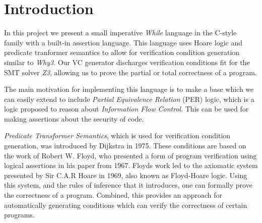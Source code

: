 \section{Introduction}



In this project we present a small imperative \textit{While} language in the C-style family with a built-in assertion language.
This language uses Hoare logic and predicate tranformer semantics to allow for verification condition generation similar to \textit{Why3}.
Our VC generator discharges verification conditions fit for the SMT solver \textit{Z3}, allowing us to prove the partial or total correctness of a program.

The main motivation for implementing this language is to make a base which we can easily extend to include \textit{Partial Equivalence Relation} (PER) logic, which is a logic proposed to reason about \textit{Information Flow Control}\cite{Filinski-Jensen-Larsen:Unpublished-IFC}. This can be used for making assertions about the security of code.

\textit{Predicate Transformer Semantics}, which is used for verification condition generation, was introduced by Dijkstra in 1975\cite{Dijkstra}.
These conditions are based on the work of Robert W. Floyd, who presented a form of program verification using logical assertions in his paper from 1967\cite{Floyd1967}. 
Floyds work led to the axiomatic system presented by Sir C.A.R Hoare in 1969\cite{Hoare}, also known as Floyd-Hoare logic. Using this system, and the rules of inference that it introduces, one can formally prove the correctness of a program.
Combined, this provides an approach for automatically generating conditions which can verify the correctness of certain programs.

